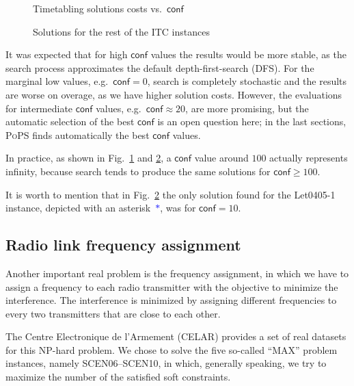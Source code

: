 \documentclass{ws-ijait}
\begin{document}
\begin{figure}
  \centering
  
  \caption{Timetabling solutions costs vs.\ 
           $\mathsf{conf}$\label{costsA}}
\end{figure}

\begin{figure}
  \centering
  
  \caption{Solutions for the rest of the ITC
           instances\label{costsB}}
\end{figure}

It was expected that for high $\mathsf{conf}$ values the
results would be more stable, as the search process
approximates the default depth-first-search (DFS). For the
marginal low values, e.g.\ $\mathsf{conf} = 0$, search is
completely stochastic and the results are worse on overage,
as we have higher solution costs. However, the evaluations
for intermediate $\mathsf{conf}$ values, e.g.\ 
$\mathsf{conf} \approx 20$, are more promising, but the
automatic selection of the best $\mathsf{conf}$ is an open
question here; in the last sections, \textsc{PoPS} finds
automatically the best $\mathsf{conf}$ values.

In practice, as shown in Fig.\ \ref{costsA} and
\ref{costsB}, a $\mathsf{conf}$ value around $100$ actually
represents infinity, because search tends to produce the
same solutions for $\mathsf{conf} \geq 100$.

It is worth to mention that in Fig.~\ref{costsB} the only
solution found for the \textsf{Let0405-1} instance, depicted
with an asterisk~\textcolor{blue}{$*$}, was for
$\mathsf{conf} = 10$.

\subsection{Radio link frequency assignment}

Another important real problem is the frequency assignment,
in which we have to assign a frequency to each radio
transmitter with the objective to minimize the interference.
The interference is minimized by assigning different
frequencies to every two transmitters that are close to each
other.

The Centre Electronique de l'Armement (CELAR) provides a set
of real datasets for this NP-hard problem.\cite{radio-link}
We chose to solve the five so-called ``MAX'' problem
instances, namely \textsf{SCEN06}--\textsf{SCEN10}, in
which, generally speaking, we try to maximize the number of
the satisfied soft constraints.
\end{document}
